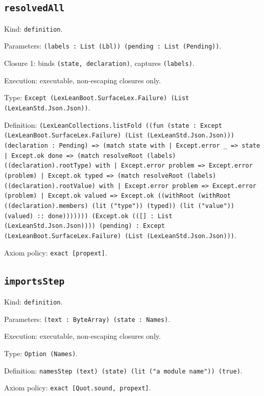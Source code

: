 \documentclass[11pt]{article}
\begin{document}
\subsection*{\texttt{resolvedAll}}
\noindent Kind: \texttt{definition}.\par
\noindent Parameters: \texttt{(labels : List (Lbl)) (pending : List (Pending))}.\par
\noindent Closure 1: binds \texttt{(state, declaration)}, captures \texttt{(labels)}.\par
\noindent Execution: executable, non-escaping closures only.\par
\noindent Type: \texttt{Except (LexLeanBoot.SurfaceLex.Failure) (List (LexLeanStd.Json.Json))}.\par
\noindent Definition: \texttt{(LexLeanCollections.listFold ((fun (state : Except (LexLeanBoot.SurfaceLex.Failure) (List (LexLeanStd.Json.Json))) (declaration : Pending) => (match state with | Except.error \_ => state | Except.ok done => (match resolveRoot (labels) ((declaration).rootType) with | Except.error problem => Except.error (problem) | Except.ok typed => (match resolveRoot (labels) ((declaration).rootValue) with | Except.error problem => Except.error (problem) | Except.ok valued => Except.ok ((withRoot (withRoot ((declaration).members) (lit ("type")) (typed)) (lit ("value")) (valued) :: done))))))) (Except.ok (([] : List (LexLeanStd.Json.Json)))) (pending) : Except (LexLeanBoot.SurfaceLex.Failure) (List (LexLeanStd.Json.Json)))}.\par
\noindent Axiom policy: \texttt{exact [propext]}.\par
\subsection*{\texttt{importsStep}}
\noindent Kind: \texttt{definition}.\par
\noindent Parameters: \texttt{(text : ByteArray) (state : Names)}.\par
\noindent Execution: executable, non-escaping closures only.\par
\noindent Type: \texttt{Option (Names)}.\par
\noindent Definition: \texttt{namesStep (text) (state) (lit ("a module name")) (true)}.\par
\noindent Axiom policy: \texttt{exact [Quot.sound, propext]}.\par
\end{document}
